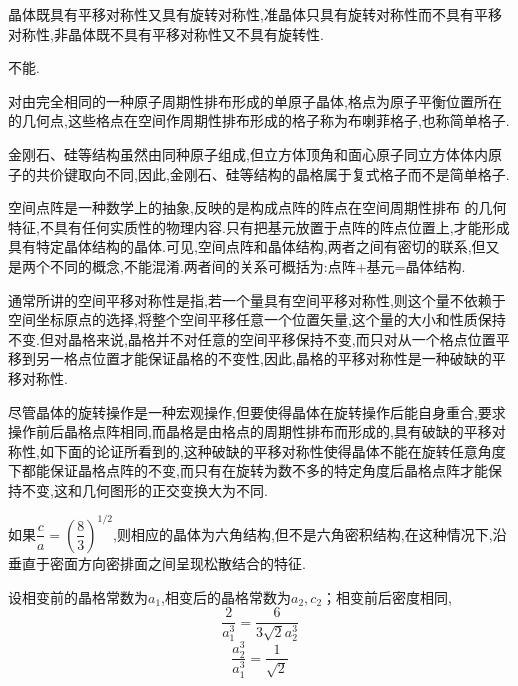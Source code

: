 \documentclass[UTF8,10pt,a4paper,oneside]{ctexart}
\begin{document}
    {晶体既具有平移对称性又具有旋转对称性,准晶体只具有旋转对称性而不具有平移对称性,非晶体既不具有平移对称性又不具有旋转性.}

    {不能.}
    
    {对由完全相同的一种原子周期性排布形成的单原子晶体,格点为原子平衡位置所在的几何点,这些格点在空间作周期性排布形成的格子称为布喇菲格子,也称简单格子.}

        {金刚石、硅等结构虽然由同种原子组成,但立方体顶角和面心原子同立方体体内原子的共价键取向不同,因此,金刚石、硅等结构的晶格属于复式格子而不是简单格子.}

    {空间点阵是一种数学上的抽象,反映的是构成点阵的阵点在空间周期性排布 的几何特征,不具有任何实质性的物理内容.只有把基元放置于点阵的阵点位置上,才能形成具有特定晶体结构的晶体.可见,空间点阵和晶体结构,两者之间有密切的联系,但又是两个不同的概念,不能混淆.两者间的关系可概括为:点阵+基元=晶体结构.}

    {通常所讲的空间平移对称性是指,若一个量具有空间平移对称性,则这个量不依赖于空间坐标原点的选择,将整个空间平移任意一个位置矢量,这个量的大小和性质保持不变.但对晶格来说,晶格并不对任意的空间平移保持不变,而只对从一个格点位置平移到另一格点位置才能保证晶格的不变性,因此,晶格的平移对称性是一种破缺的平移对称性.}

    {尽管晶体的旋转操作是一种宏观操作,但要使得晶体在旋转操作后能自身重合,要求操作前后晶格点阵相同,而晶格是由格点的周期性排布而形成的,具有破缺的平移对称性,如下面的论证所看到的,这种破缺的平移对称性使得晶体不能在旋转任意角度下都能保证晶格点阵的不变,而只有在旋转为数不多的特定角度后晶格点阵才能保持不变,这和几何图形的正交变换大为不同.}

    {如果$\dfrac{c}{a}=(\dfrac{8}{3})^{1/2}$,则相应的晶体为六角结构,但不是六角密积结构,在这种情况下,沿垂直于密面方向密排面之间呈现松散结合的特征.}
 
    {设相变前的晶格常数为$a_1$,相变后的晶格常数为$a_2,c_2$；相变前后密度相同,\[ \dfrac{2}{a_1^3}=\dfrac{6}{3\sqrt{2}a_2^3}\]
        \[ \dfrac{a_2^3}{a_1^3}=\dfrac{1}{\sqrt{2}}\]}
\end{document}
